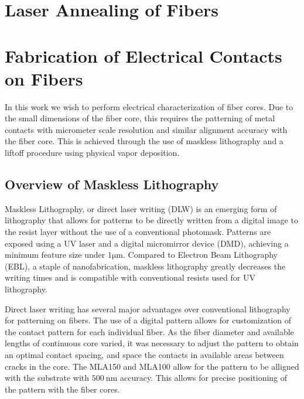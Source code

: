 \section{Laser Annealing of Fibers}
\section{Fabrication of Electrical Contacts on Fibers}

In this work we wish to perform electrical characterization of fiber cores. Due to the small dimensions of the fiber core, this requires the patterning of metal contacts with micrometer scale resolution and similar alignment accuracy with the fiber core. This is achieved through the use of maskless lithography and a liftoff procedure using physical vapor deposition.%
 

\subsection{Overview of Maskless Lithography}
Maskless Lithography, or direct laser writing (DLW) is an emerging form of lithography that allows for patterns to be directly written from a digital image to the resist layer without the use of a conventional photomask. Patterns are exposed using a UV laser and a digital micromirror device (DMD), achieving a minimum feature size under $1 \si{\micro\meter}$. Compared to Electron Beam Lithography (EBL), a staple of nanofabrication, maskless lithography greatly decreases the writing times and is compatible with conventional resists used for UV lithography. 

Direct laser writing has several major advantages over conventional lithography for patterning on fibers. The use of a digital pattern allows for customization of the contact pattern for each individual fiber. As the fiber diameter and available lengths of continuous core varied, it was necessary to adjust the pattern to obtain an optimal contact spacing, and space the contacts in available areas between cracks in the core. The MLA150 and MLA100 allow for the pattern to be alligned with the substrate with $\SI{500}{\nm}$ accuracy. This allows for precise positioning of the pattern with the fiber cores. 

